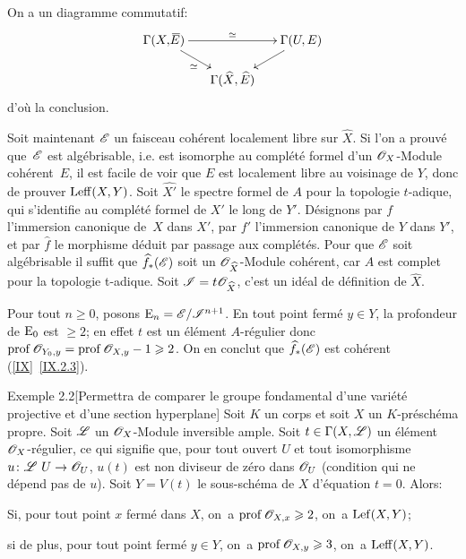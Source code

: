 On a un diagramme commutatif:
\[
\xymatrix@=5mm{ \Gamma(X, \overline{\!E})\ar[rr]^{\simeq}\ar[dr]_{\simeq} && \Gamma(U, E)\ar[dl]\\
&\Gamma(\hat{X}, \hat{E})}
\]
d'o\`u la conclusion.

Soit maintenant ${\mathscr E}$ un faisceau coh\'erent localement libre sur $\hat{X}$. Si l'on a prouv\'e que~${\mathscr E}$ est alg\'ebrisable, i.e. est isomorphe au compl\'et\'e formel d'un $\mathscr{O}_X$-Module coh\'erent~$E$, il est facile de voir que $E$ est localement libre au voisinage de $Y$, donc de prouver $\operatorname{Leff} (X, Y)$. Soit $\widehat{X'}$ le spectre formel de $A$ pour la topologie $t$-adique, qui s'identifie au compl\'et\'e formel de $X'$ le long de $Y'$. D\'esignons par $f$ l'immersion canonique de~$X$ dans $X'$, par $f'$ l'immersion canonique de $Y$ dans $Y'$, et par $\hat{f}$ le morphisme d\'eduit par passage aux compl\'et\'es. Pour que ${\mathscr E}$ soit alg\'ebrisable il suffit que $\widehat{f}_\ast({\mathscr E})$ soit un ${\mathscr O}_{\widehat{X}}$-Module coh\'erent, car $A$ est complet pour la topologie t-adique. Soit ${\mathscr I} = t{\mathscr O}_{\widehat{X}}$, c'est un id\'eal de d\'efinition de $\hat{X}$.

Pour tout $n\geq 0$, posons $\operatorname{E}_n={\mathscr E}/{\mathscr I}^{n+1}$. En tout point ferm\'e $y\in Y$, la profondeur de $\operatorname{E}_0$ est $\geq 2$; en effet $t$ est un \'el\'ement $A$-r\'egulier donc $\operatorname{prof}{\mathscr O}_{Y_0, y}=\operatorname{prof}{\mathscr O}_{X, y}-1\geqslant 2$. On en conclut que $\widehat{f}_\ast({\mathscr E})$ est coh\'erent (\ref{IX}~\ref{IX.2.3}). \cqfd

\label{X.2.2}
\begin{enonce*}[remark]{Exemple 2.2}[{{\normalfont Permettra de comparer le groupe fondamental d'une vari\'et\'e projective et d'une section hyperplane}}]
Soit $K$ un corps et soit $X$ un $K$-pr\'esch\'ema propre. Soit ${\mathscr L}$ un $\mathscr{O}_X$-Module inversible ample. Soit $t \in \Gamma(X, {\mathscr L})$ un \'el\'ement $\mathscr{O}_X$-r\'egulier, ce qui signifie que, pour tout ouvert $U$ et tout isomorphisme $u\colon \Ll~U\to\Oo_U$, \/$u(t)$ est non diviseur de z\'ero dans ${\mathscr O}_U$ (condition qui ne d\'epend pas de $u$). Soit $Y = V(t)$ le sous-sch\'ema de $X$ d'\'equation $t = 0$. Alors:
\begin{enumeratei}
\item
Si, pour tout point $x$ ferm\'e dans $X$, on~a $\operatorname{prof}{\mathscr O}_{X, x}\geqslant 2$, on~a $\operatorname{Lef} (X, Y)$;

\item
si de plus, pour tout point ferm\'e $y\in Y$, on~a $\operatorname{prof}{\mathscr O}_{X, y}\geqslant 3$, on~a $\operatorname{Leff} (X, Y)$.
\end{enumeratei}
\end{enonce*}

